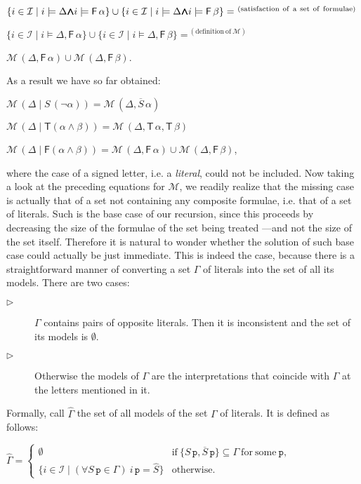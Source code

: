 \documentclass[a4paper,UKenglish]{lipics}
\newcounter{c}
\newcommand{\dit}{$\triangleright$}
\newcommand{\lett}[1]{\texttt{#1}}
\newcommand{\sg}[1]{\textsf{#1}}
\newcommand{\mean}[1]{\ensuremath{\hat{#1}}}
\newcommand{\op}[1]{\ensuremath{\overline{#1}}}
\newcommand{\interprt}{\ensuremath{\mathcal{I}}}
\newcommand{\sat}[2]{\ensuremath{#1\models#2}}
\newcommand{\allmodels}{\ensuremath{\mathcal{M}}}
\newcommand{\iset}[1]{\ensuremath{\{i\in\interprt \mid #1\}}}
\newcommand{\ssplit}[2]{\ensuremath{#1\!\mid\!#2}}
\newcommand{\lmods}[1]{\ensuremath{\hat{#1}}}
\newcommand{\Mwedge}{\ensuremath{{\wedge\hspace{-0.65em}\wedge}\hspace{-0.65em}{\wedge\hspace{-0.65em}\wedge}}}
\begin{document}
$\iset{\sat{i}{\Delta} \Mwedge \sat{i}{\sg{F}\,\alpha}} \cup \iset{\sat{i}{\Delta} \Mwedge \sat{i}{\sg{F}\,\beta}}
=^{\mathrm{\ (satisfaction\ of\ a\ set\ of\ formulae)}}$

$\iset{\sat{i}{\Delta, \sg{F}\,\alpha}} \cup \iset{\sat{i}{\Delta, \sg{F}\,\beta}}
=^{\mathrm{\ (definition\ of\ \allmodels)}}$

$\allmodels\,(\Delta, \sg{F}\,\alpha) \cup \allmodels\,(\Delta, \sg{F}\,\beta)$.



\noindent As a result we have so far obtained:



$\allmodels\,(\ssplit{\Delta}{S\,(\neg\alpha)})  = \allmodels\,(\Delta, \op{S}\,\alpha)$

$\allmodels\,(\ssplit{\Delta}{\sg{T}(\alpha\wedge\beta)}) = \allmodels\,(\Delta, \sg{T}\,\alpha,\sg{T}\,\beta)$

$\allmodels\,(\ssplit{\Delta}{\sg{F}(\alpha\wedge\beta)})  = \allmodels\,(\Delta, \sg{F}\,\alpha) \cup \allmodels\,(\Delta, \sg{F}\,\beta)$,



\noindent where the case of a signed letter, i.e. a \emph{literal}, could not be included. Now taking a look at the preceding equations for \allmodels, we readily realize that the missing case is actually that of a set not containing any composite formulae, i.e. that of a set of literals. Such is the base case of our recursion, since this proceeds by decreasing the size of the formulae of the set being treated ---and not the size of the set itself.
Therefore it is natural to wonder whether the solution of such base case could actually be just immediate.
This is indeed the case, because there is a straightforward manner of converting a set $\Gamma$ of literals into the set of all its models. There are two cases:\begin{description}
\item[\dit] $\Gamma$ contains pairs of opposite literals. Then it is inconsistent and the set of its models is $\emptyset$.
\item[\dit] Otherwise the models of $\Gamma$ are the interpretations that coincide with $\Gamma$ at the letters mentioned in it.
\end{description}
Formally, call \lmods{\Gamma} the set of all models of the set $\Gamma$ of literals. It is defined as follows:

$\lmods{\Gamma} = \left\{ \begin{array}{ll}
	\emptyset & \mathrm{if}\ \{S\,\lett{p}, \op{S}\,\lett{p}\} \subseteq \Gamma\ \mathrm{for\ some}\ \lett{p}, \\
	\iset{(\forall S\,\lett{p} \in \Gamma)\ i\,\lett{p} = \mean{S}} & \mathrm{otherwise.}
\end{array}\right.$
\end{document}
